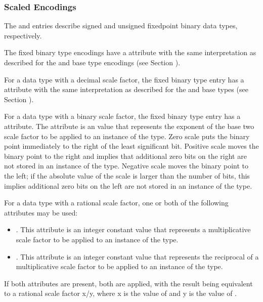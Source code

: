 {\subsubsection{Scaled Encodings}
\label{chap:scaledencodings}
The \DWATEsignedfixed{} and \DWATEunsignedfixed{} entries
describe signed and unsigned fixed\dash point binary data types,
respectively.

The fixed binary type encodings have a
\DWATdigitcount{} attribute
with the same interpretation as described for the
\DWATEpackeddecimal{} and \DWATEnumericstring{} base type encodings
(see Section ).

For a data type with a decimal scale factor, 
the fixed binary
type entry has a \DWATdecimalscale{} attribute 
with the same interpretation as described for the 
\DWATEpackeddecimal{} and \DWATEnumericstring{} base types
(see Section ).

For\hypertarget{chap:DWATbinaryscalebinaryscalefactorforfixedpointtype}{}
a data type with a binary scale factor, the fixed
binary type entry has a \DWATbinaryscaleNAME{} attribute. 
The \DWATbinaryscaleDEFN{} attribute 
is an  value
that represents the exponent of the base two scale factor to
be applied to an instance of the type.  Zero scale puts the
binary point immediately to the right of the least significant
bit. Positive scale moves the binary point to the right and
implies that additional zero bits on the right are not stored
in an instance of the type. Negative scale moves the binary
point to the left; if the absolute value of the scale is
larger than the number of bits, this implies additional zero
bits on the left are not stored in an instance of the type.

\bb
For a data type with a rational scale factor, 
one or both of the following attributes may be used:
\begin{itemize}
\item
\DWATscalemultiplierDEFN\hypertarget{chap:DWATscalemultiplierofscalefactor}{}. 
This attribute is an integer constant value
that represents a multiplicative scale factor to be applied to an
instance of the type.
\item
\DWATscaledivisorDEFN\hypertarget{chap:DWATscaledivisorofscalefactor}{}. 
This attribute is an integer constant value
that represents the reciprocal of a multiplicative scale factor to be
applied to an instance of the type.
\end{itemize}
If both attributes are present, both are applied, with the result
being equivalent to a rational scale factor x/y, where x is the
value of \DWATscalemultiplierNAME{} and y is the value of \DWATscaledivisorNAME.
\eb

}
